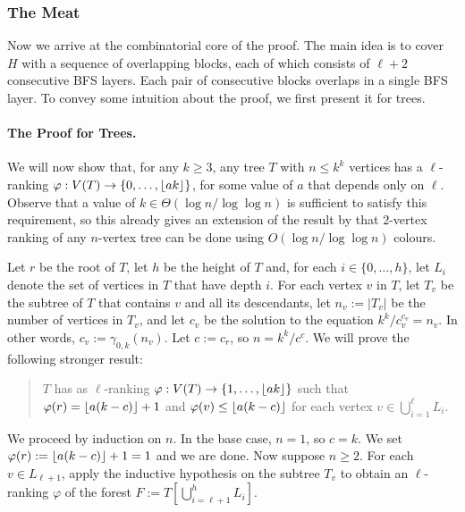 \documentclass[kpfonts]{patmorin}
\theoremstyle{named}
\begin{document}
\subsubsection{The Meat}

Now we arrive at the combinatorial core of the proof. The main idea is to cover $H$ with a sequence of overlapping blocks, each of which consists of $\ell+2$ consecutive BFS layers.  Each pair of consecutive blocks overlaps in a single BFS layer. To convey some intuition about the proof, we first present it for trees.

\paragraph{The Proof for Trees.}

We will now show that, for any $k\ge 3$, any tree $T$ with $n \le k^k$ vertices has a $\ell$-ranking $\varphi:V(T)\to\{0,\ldots,{\lfloor ak \rfloor}\}$, for some value of $a$ that depends only on $\ell$.  Observe that a value of $k\in\Theta(\log n/\log\log n)$ is sufficient to satisfy this requirement, so this already gives an extension of the result by \citet{karpas.neiman.ea:on} that $2$-vertex ranking of any $n$-vertex tree can be done using $O(\log n/\log\log n)$ colours.

Let $r$ be the root of $T$, let $h$ be the height of $T$ and, for each $i\in\{0,\ldots,h\}$, let $L_i$ denote the set of vertices in $T$ that have depth $i$.  For each vertex $v$ in $T$, let $T_v$ be the subtree of $T$ that contains $v$ and all its descendants, let $n_v:=|T_v|$ be the number of vertices in $T_v$, and let $c_v$ be the solution to the equation $k^k/c_v^{c_v} = n_v$.  In other words, $c_v:=\gamma_{0,k}(n_v)$.  Let $c:=c_r$, so $n=k^k/c^c$.  We will prove the following stronger result:

\begin{quote}
    $T$ has as $\ell$-ranking $\varphi:V(T)\to\{1,\ldots,{\lfloor ak \rfloor}\}$ such that $\varphi(r)={\lfloor a(k-c) \rfloor}+1$ and $\varphi(v)\le {\lfloor a(k-c) \rfloor}$ for each vertex $v\in\bigcup_{i=1}^\ell L_i$.
\end{quote}

We proceed by induction on $n$. In the base case, $n=1$, so $c=k$.  We set $\varphi(r):={\lfloor a(k-c) \rfloor}+1=1$ and we are done. Now suppose $n\ge 2$.  For each $v\in L_{\ell+1}$, apply the inductive hypothesis on the subtree $T_v$ to obtain an $\ell$-ranking $\varphi$ of the forest $F:=T[\bigcup_{i=\ell+1}^h L_i]$.
\end{document}

